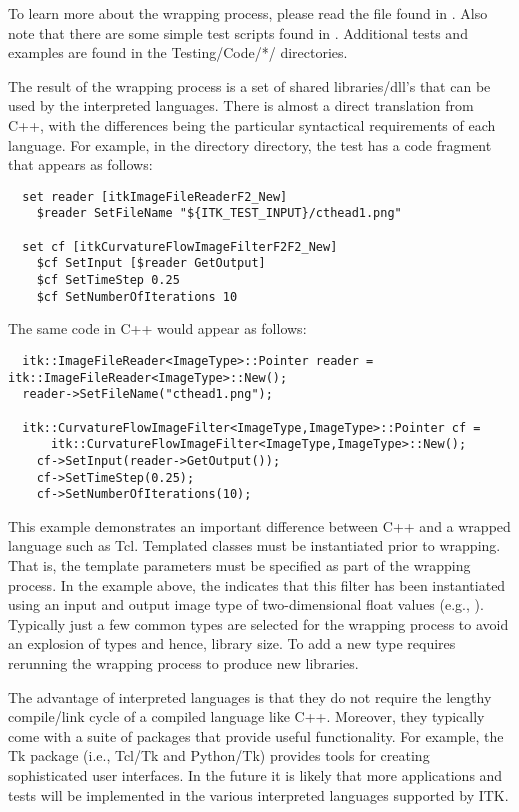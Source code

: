 To learn more about the wrapping process, please read the file found in
. Also note that there are some simple test
scripts found in . Additional tests and examples
are found in the {Testing/Code/*/} directories.

The result of the wrapping process is a set of shared libraries/dll's that
can be used by the interpreted languages. There is almost a direct
translation from C++, with the differences being the particular syntactical
requirements of each language. For example, in the directory
 directory, the test
 has a code fragment that appears as
follows: 
\small
\begin{verbatim}
  set reader [itkImageFileReaderF2_New]
    $reader SetFileName "${ITK_TEST_INPUT}/cthead1.png"

  set cf [itkCurvatureFlowImageFilterF2F2_New]
    $cf SetInput [$reader GetOutput]
    $cf SetTimeStep 0.25
    $cf SetNumberOfIterations 10
\end{verbatim}
\normalsize
The same code in C++ would appear as follows:

\small
\begin{verbatim}
  itk::ImageFileReader<ImageType>::Pointer reader = itk::ImageFileReader<ImageType>::New();
  reader->SetFileName("cthead1.png");

  itk::CurvatureFlowImageFilter<ImageType,ImageType>::Pointer cf =
      itk::CurvatureFlowImageFilter<ImageType,ImageType>::New();
    cf->SetInput(reader->GetOutput());
    cf->SetTimeStep(0.25);
    cf->SetNumberOfIterations(10);
\end{verbatim}
\normalsize

This example demonstrates an important difference between C++ and a wrapped
language such as Tcl.  Templated classes must be instantiated prior to
wrapping. That is, the template parameters must be specified as part of the
wrapping process. In the example above, the
 indicates that this filter has been
instantiated using an input and output image type of two-dimensional float
values (e.g., ). Typically just a few common types are selected for
the wrapping process to avoid an explosion of types and hence, library
size. To add a new type requires rerunning the wrapping process to produce
new libraries.

The advantage of interpreted languages is that they do not require the
lengthy compile/link cycle of a compiled language like C++. Moreover, they
typically come with a suite of packages that provide useful
functionality. For example, the Tk package (i.e., Tcl/Tk and Python/Tk)
provides tools for creating sophisticated user interfaces. In the future it
is likely that more applications and tests will be implemented in the various
interpreted languages supported by ITK.


%
%
%
